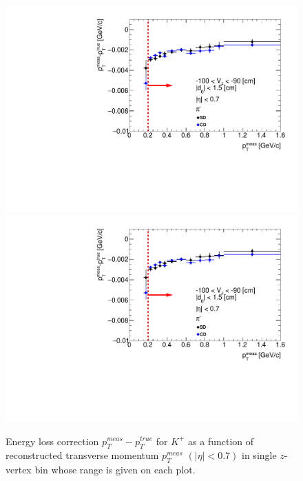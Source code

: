 \begin{figure}[H]
\caption[Energy loss correction for $K^+$ as a function of reconstructed transverse momentum $p_T^{meas}$.]{Energy loss correction $p_T^{meas}-p_T^{true}$ for $K^+$ as a function of reconstructed transverse momentum $p_T^{meas}$ $\left(|\eta|<0.7\right)$ in single $z$-vertex bin whose range is given on each plot.}\label{fig:energyLossPrimaryK_plus}
\parbox{0.329\textwidth}{
  \includegraphics[width=\linewidth,page=83]{graphics/energyLoss/energyLoss3D_OnePrtAlso.pdf}\\
  \includegraphics[width=\linewidth,page=86]{graphics/energyLoss/energyLoss3D_OnePrtAlso.pdf}\\
}
\end{figure}
